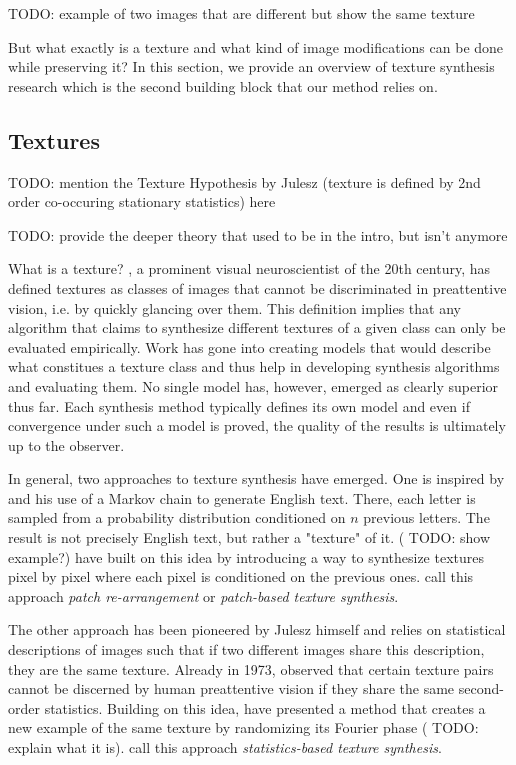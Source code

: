 {\color{red} TODO: example of two images that are different but show the same texture}

But what exactly is a texture and what kind of image modifications can be done while preserving it? In this section, we provide an overview of texture synthesis research which is the second building block that our method relies on.

\subsection{Textures}
\label{section:background-texture_synthesis-textures}

{\color{red} TODO: mention the Texture Hypothesis by Julesz (texture is defined by 2nd order co-occuring stationary statistics) here}

{\color{red} TODO: provide the deeper theory that used to be in the intro, but isn't anymore}

What is a texture? \citet{Julesz1995}, a prominent visual neuroscientist of the 20th century, has defined textures as classes of images that cannot be discriminated in preattentive vision, i.e. by quickly glancing over them. This definition implies that any algorithm that claims to synthesize different textures of a given class can only be evaluated empirically. Work has gone into creating models that would describe what constitues a texture class and thus help in developing synthesis algorithms and evaluating them. No single model has, however, emerged as clearly superior thus far. Each synthesis method typically defines its own model and even if convergence under such a model is proved, the quality of the results is ultimately up to the observer.

In general, two approaches to texture synthesis have emerged. One is inspired by \citet{Shannon1948} and his use of a Markov chain to generate English text. There, each letter is sampled from a probability distribution conditioned on \(n\) previous letters. The result is not precisely English text, but rather a "texture" of it. ({\color{red} TODO: show example?}) \citet{Efros1999} have built on this idea by introducing a way to synthesize textures pixel by pixel where each pixel is conditioned on the previous ones. \citet{Raad2018} call this approach \textit{patch re-arrangement} or \textit{patch-based texture synthesis}.

The other approach has been pioneered by Julesz himself and relies on statistical descriptions of images such that if two different images share this description, they are the same texture. Already in 1973, \citet{Julesz1973} observed that certain texture pairs cannot be discerned by human preattentive vision if they share the same second-order statistics. Building on this idea, \citet{Galerne2011} have presented a method that creates a new example of the same texture by randomizing its Fourier phase ({\color{red} TODO: explain what it is}). \citet{Raad2018} call this approach \textit{statistics-based texture synthesis}.

